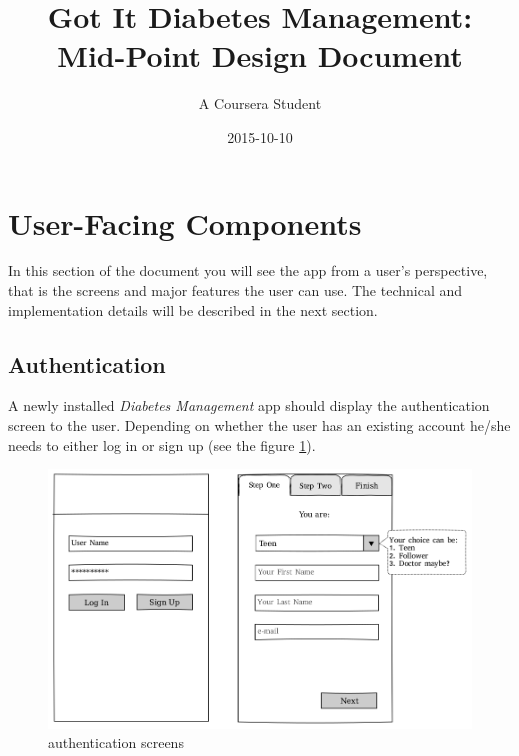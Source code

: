 \documentclass{article}
\title{Got It Diabetes Management:\\Mid-Point Design Document}
\date{2015-10-10}
\author{A Coursera Student}
\begin{document}
    \maketitle
    \newpage

    \section{User-Facing Components}

    In this section of the document you will see the app from a user's perspective, that is the screens and major features the user can use. The technical and implementation details will be described in the next section.

\newpage

    \subsection{Authentication}

    A newly installed \emph{Diabetes Management} app should display the authentication screen to the user. Depending on whether the user has an existing account he/she needs to either log in or sign up (see the figure \ref{fig:screen_auth}).

    \begin{figure}[h]
        \centering
        \includegraphics[width=\textwidth,height=\textheight,keepaspectratio]{auth.png}
        \caption{authentication screens}
        \label{fig:screen_auth}
    \end{figure}
\end{document}
